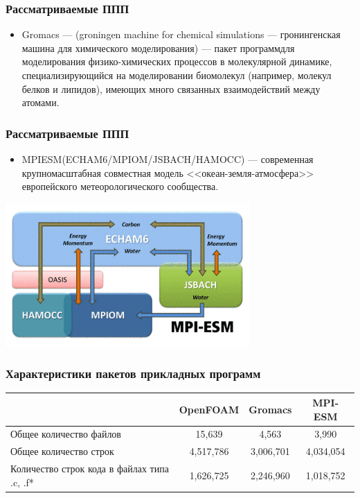\documentclass{beamer}
\begin{document}
\begin{frame}
\frametitle{Рассматриваемые ППП}
\begin{itemize}
	\item Gromacs  --- (groningen machine for chemical
simulations --- гронингенская машина для химического моделирования) --- пакет
 программдля моделирования физико-химических процессов в молекулярной динамике,
  специализирующийся на моделировании биомолекул (например, молекул белков и липидов),
   имеющих много связанных взаимодействий между атомами.
\end{itemize}
\end{frame}

\begin{frame}
\frametitle{Рассматриваемые ППП}
\begin{itemize}
	\item MPIESM(ECHAM6/MPIOM/JSBACH/HAMOCC) --- современная крупномасштабная
    совместная модель <<океан-земля-атмосфера>> европейского метеорологического сообщества.
\end{itemize}
\begin{center}
\includegraphics[width=0.7\textwidth]{img/mpiesm.png}
\end{center}
\end{frame}

\begin{frame}
\frametitle{Характеристики пакетов прикладных программ}
\renewcommand{\arraystretch}{1.8} %
\begin{tabular}{|p{3.8cm}|c|c|c|}
\hline
 & OpenFOAM &  Gromacs & MPI-ESM\\
\hline
Общее количество
\newline файлов & 15,639 & 4,563 & 3,990\\
\hline
Общее количество строк & 4,517,786 & 3,006,701 & 4,034,054 \\
\hline
Количество строк  кода
\newline в файлах типа .c, .f* & 1,626,725 & 2,246,960 & 1,018,752\\
\hline
\end{tabular}
\end{frame}
\end{document}
